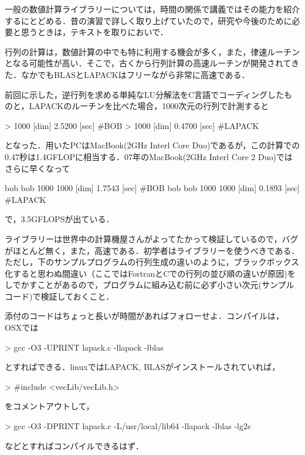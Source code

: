 一般の数値計算ライブラリーについては，時間の関係で講義ではその能力を紹介するにとどめる．昔の演習で詳しく取り上げていたので，研究や今後のために必要と思うときは，テキストを取りにおいで．

行列の計算は，数値計算の中でも特に利用する機会が多く，また，律速ルーチンとなる可能性が高い．そこで，古くから行列計算の高速ルーチンが開発されてきた．なかでもBLASとLAPACKはフリーながら非常に高速である． 

前回に示した，逆行列を求める単純なLU分解法をC言語でコーディングしたものと，LAPACKのルーチンを比べた場合，1000次元の行列で計測すると
\begin{MapleInput}
>  1000 [dim]     2.5200 [sec] #BOB
>  1000 [dim]     0.4700 [sec] #LAPACK
\end{MapleInput}
となった．用いたPCはMacBook(2GHz Interl Core Duo)であるが，この計算での0.47秒は1.4GFLOPに相当する．07年のMacBook(2GHz Interl Core 2 Duo)ではさらに早くなって
\begin{MapleInput}
bob%
bob%
1000
 1000 [dim]     1.7543 [sec] #BOB
bob%
bob%
1000
 1000 [dim]     0.1893 [sec] #LAPACK
\end{MapleInput}
で，3.5GFLOPSが出ている．

ライブラリーは世界中の計算機屋さんがよってたかって検証しているので，バグがほとんど無く，また，高速である．初学者はライブラリーを使うべきである．ただし，下のサンプルプログラムの行列生成の違いのように，ブラックボックス化すると思わぬ間違い（ここではFortranとCでの行列の並び順の違いが原因)をしでかすことがあるので，プログラムに組み込む前に必ず小さい次元(サンプルコード)で検証しておくこと．

添付のコードはちょっと長いが時間があればフォローせよ．コンパイルは，OSXでは
\begin{MapleInput}
> gcc -O3 -UPRINT lapack.c -llapack -lblas
\end{MapleInput}
とすればできる．linuxではLAPACK, BLASがインストールされていれば，
\begin{MapleInput}
> #include <vecLib/vecLib.h>
\end{MapleInput}
をコメントアウトして，
\begin{MapleInput}
> gcc -O3 -DPRINT lapack.c -L/usr/local/lib64 -llapack -lblas -lg2c
\end{MapleInput}
などとすればコンパイルできるはず．


